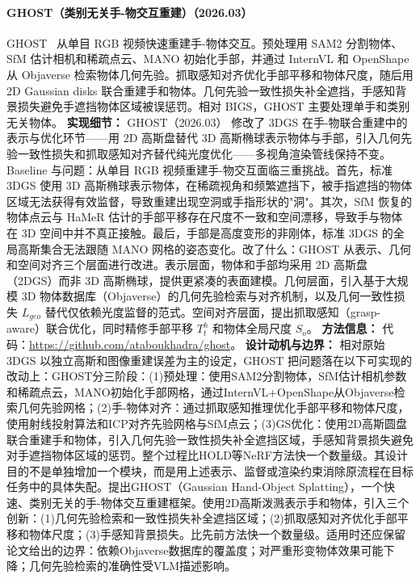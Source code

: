 \paragraph{GHOST（类别无关手-物交互重建）（2026.03）}
GHOST~\cite{2603_18912} 从单目 RGB 视频快速重建手-物体交互。预处理用 SAM2 分割物体、SfM 估计相机和稀疏点云、MANO 初始化手部，并通过 InternVL 和 OpenShape 从 Objaverse 检索物体几何先验。抓取感知对齐优化手部平移和物体尺度，随后用 2D Gaussian disks 联合重建手和物体。几何先验一致性损失补全遮挡，手感知背景损失避免手遮挡物体区域被误惩罚。相对 BIGS，GHOST 主要处理单手和类别无关物体。
\textbf{实现细节：} GHOST（2026.03） 修改了 3DGS 在手-物联合重建中的表示与优化环节——用 2D 高斯盘替代 3D 高斯椭球表示物体与手部，引入几何先验一致性损失和抓取感知对齐替代纯光度优化——多视角渲染管线保持不变。Baseline 与问题：从单目 RGB 视频重建手-物交互面临三重挑战。首先，标准 3DGS 使用 3D 高斯椭球表示物体，在稀疏视角和频繁遮挡下，被手指遮挡的物体区域无法获得有效监督，导致重建出现空洞或手指形状的"洞"。其次，SfM 恢复的物体点云与 HaMeR 估计的手部平移存在尺度不一致和空间漂移，导致手与物体在 3D 空间中并不真正接触。最后，手部是高度变形的非刚体，标准 3DGS 的全局高斯集合无法跟随 MANO 网格的姿态变化。改了什么：GHOST 从表示、几何和空间对齐三个层面进行改进。表示层面，物体和手部均采用 2D 高斯盘（2DGS）而非 3D 高斯椭球，提供更紧凑的表面建模。几何层面，引入基于大规模 3D 物体数据库（Objaverse）的几何先验检索与对齐机制，以及几何一致性损失 $L_{geo}$ 替代仅依赖光度监督的范式。空间对齐层面，提出抓取感知（grasp-aware）联合优化，同时精修手部平移 $T_t^h$ 和物体全局尺度 $S_o$。
\textbf{方法信息：} 代码：\url{https://github.com/ataboukhadra/ghost}。
\textbf{设计动机与边界：} 相对原始 3DGS 以独立高斯和图像重建误差为主的设定，GHOST 把问题落在以下可实现的改动上：GHOST分三阶段：(1)预处理：使用SAM2分割物体，SfM估计相机参数和稀疏点云，MANO初始化手部网格，通过InternVL+OpenShape从Objaverse检索几何先验网格；(2)手-物体对齐：通过抓取感知推理优化手部平移和物体尺度，使用射线投射算法和ICP对齐先验网格与SfM点云；(3)GS优化：使用2D高斯圆盘联合重建手和物体，引入几何先验一致性损失补全遮挡区域，手感知背景损失避免对手遮挡物体区域的惩罚。整个过程比HOLD等NeRF方法快一个数量级。其设计目的不是单独增加一个模块，而是用上述表示、监督或渲染约束消除原流程在目标任务中的具体失配。提出GHOST（Gaussian Hand-Object Splatting），一个快速、类别无关的手-物体交互重建框架。使用2D高斯泼溅表示手和物体，引入三个创新：(1)几何先验检索和一致性损失补全遮挡区域；(2)抓取感知对齐优化手部平移和物体尺度；(3)手感知背景损失。比先前方法快一个数量级。适用时还应保留论文给出的边界：依赖Objaverse数据库的覆盖度；对严重形变物体效果可能下降；几何先验检索的准确性受VLM描述影响。
